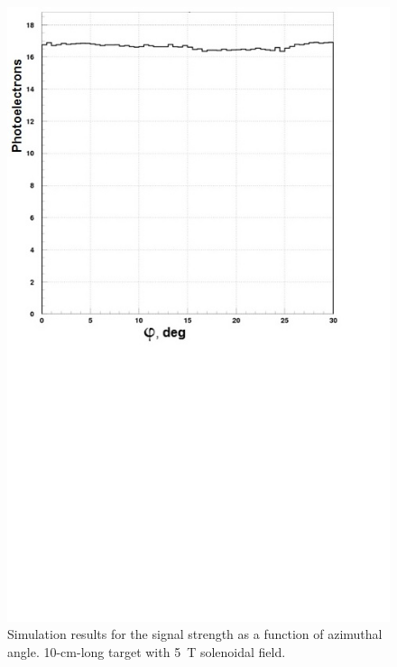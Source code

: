 \begin{figure}[!ht]
    \centering
    \includegraphics[width=1.0\linewidth,trim={0.0cm 9.4cm 0.0cm 0.0cm},clip]{images/10cm_Targ_5T_Field_Phi.jpg}
    \caption{Simulation results for the signal strength as a function of azimuthal angle. 10-cm-long target with 5~T
      solenoidal field.}
    \label{fig:10cm_Targ_5T_Field_Phi}
\end{figure}

